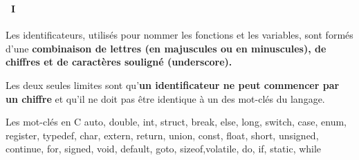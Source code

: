 \begin{frame}
  \frametitle{\secname}
  \framesubtitle{\subsecname~I} 
  Les identificateurs, utilisés pour nommer les fonctions et les variables, sont formés d'une \textbf{combinaison de lettres (en majuscules ou en minuscules), 
  de chiffres et de caractères souligné (underscore).}
  \vspace{0.5cm}
  \par
  Les deux seules limites sont qu'\textbf{un identificateur ne peut commencer par un chiffre} et qu'il ne doit pas être identique à un des mot-clés du langage.
  \begin{block}{Les mot-clés en C}
auto, double, int, struct, break, else, long, switch, case, enum, register, typedef, char, extern, return, 
union, const, float, short, unsigned, continue, for, signed, void, default, goto, sizeof,volatile, do, if, static, while
  \end{block}
\end{frame}

